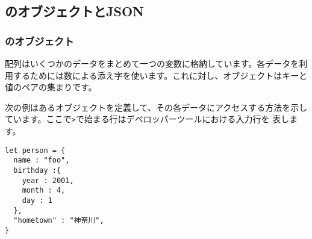 \subsection{\JS のオブジェクトとJSON}
\subsubsection{\JS のオブジェクト}
配列はいくつかのデータをまとめて一つの変数に格納しています。各データを利
用するためには数による添え字を使います。これに対し、オブジェクトはキーと
値のペアの集まりです。

次の例はあるオブジェクトを定義して、その各データにアクセスする方法を示し
ています。ここで\texttt{>}で始まる行はデベロッパーツールにおける入力行を
表します。
\begin{Verbatim}
let person = {
  name : "foo",
  birthday :{
    year : 2001,
    month : 4,
    day : 1
  },
  "hometown" : "神奈川",
}
\end{Verbatim}
